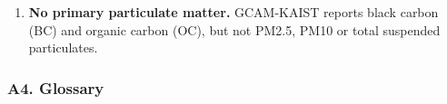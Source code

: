 \begin{enumerate}
  \begin{itemize}
  \tightlist
  \item
    46\%
    of
    coefficients
    stay
    frozen
    at
    their
    2021
    value;
  \item
    52\%
    decline
    along
    the
    pre-set
    curve;
  \item
    in
    2050,
    93\%
    are
    identical
    in
    \texttt{ref}
    and
    \texttt{nz}.
  \end{itemize}
\item
  \textbf{No
  primary
  particulate
  matter.}
  GCAM-KAIST
  reports
  black
  carbon
  (BC) and
  organic
  carbon
  (OC),
  but not
  PM2.5,
  PM10 or
  total
  suspended
  particulates.
\end{enumerate}

\hypertarget{a4.-glossary}{%
\subsubsection{A4.
Glossary}\label{a4.-glossary}}

